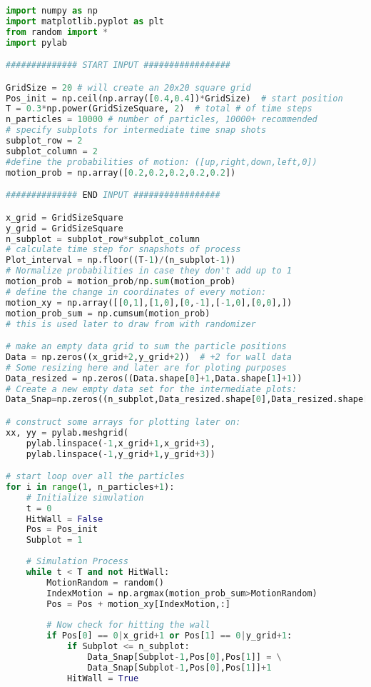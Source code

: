 \begin{lstlisting}[language = python, caption = 2D Ramdom Walk Simulation]
import numpy as np
import matplotlib.pyplot as plt
from random import *
import pylab

############## START INPUT #################

GridSize = 20 # will create an 20x20 square grid
Pos_init = np.ceil(np.array([0.4,0.4])*GridSize)  # start position
T = 0.3*np.power(GridSizeSquare, 2)  # total # of time steps
n_particles = 10000 # number of particles, 10000+ recommended
# specify subplots for intermediate time snap shots
subplot_row = 2             
subplot_column = 2
#define the probabilities of motion: ([up,right,down,left,0]) 
motion_prob = np.array([0.2,0.2,0.2,0.2,0.2])

############## END INPUT #################

x_grid = GridSizeSquare
y_grid = GridSizeSquare
n_subplot = subplot_row*subplot_column
# calculate time step for snapshots of process
Plot_interval = np.floor((T-1)/(n_subplot-1))
# Normalize probabilities in case they don't add up to 1
motion_prob = motion_prob/np.sum(motion_prob)
# define the change in coordinates of every motion:
motion_xy = np.array([[0,1],[1,0],[0,-1],[-1,0],[0,0],])
motion_prob_sum = np.cumsum(motion_prob)
# this is used later to draw from with randomizer

# make an empty data grid to sum the particle positions
Data = np.zeros((x_grid+2,y_grid+2))  # +2 for wall data
# Some resizing here and later are for ploting purposes
Data_resized = np.zeros((Data.shape[0]+1,Data.shape[1]+1))
# Create a new empty data set for the intermediate plots:
Data_Snap=np.zeros((n_subplot,Data_resized.shape[0],Data_resized.shape[1]))

# construct some arrays for plotting later on:
xx, yy = pylab.meshgrid(
    pylab.linspace(-1,x_grid+1,x_grid+3),
    pylab.linspace(-1,y_grid+1,y_grid+3))

# start loop over all the particles
for i in range(1, n_particles+1):
    # Initialize simulation
    t = 0
    HitWall = False
    Pos = Pos_init
    Subplot = 1
    
    # Simulation Process
    while t < T and not HitWall:
        MotionRandom = random()
        IndexMotion = np.argmax(motion_prob_sum>MotionRandom)
        Pos = Pos + motion_xy[IndexMotion,:] 
        
        # Now check for hitting the wall
        if Pos[0] == 0|x_grid+1 or Pos[1] == 0|y_grid+1:
            if Subplot <= n_subplot:             
                Data_Snap[Subplot-1,Pos[0],Pos[1]] = \
                Data_Snap[Subplot-1,Pos[0],Pos[1]]+1
            HitWall = True


\end{lstlisting}
